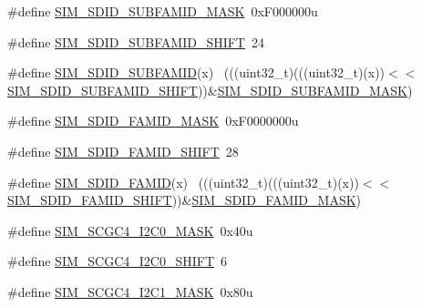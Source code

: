\begin{DoxyCompactItemize}
\item 
\#define \hyperlink{group___s_i_m___register___masks_ga530d8fe59d2589cf56c00456e89487aa}{S\+I\+M\+\_\+\+S\+D\+I\+D\+\_\+\+S\+U\+B\+F\+A\+M\+I\+D\+\_\+\+M\+A\+SK}~0x\+F000000u
\item 
\#define \hyperlink{group___s_i_m___register___masks_ga5e40d63bf136287a591bb4fa0b019aba}{S\+I\+M\+\_\+\+S\+D\+I\+D\+\_\+\+S\+U\+B\+F\+A\+M\+I\+D\+\_\+\+S\+H\+I\+FT}~24
\item 
\#define \hyperlink{group___s_i_m___register___masks_gaeb8cbd3ce47088f536b52d28b1f4a087}{S\+I\+M\+\_\+\+S\+D\+I\+D\+\_\+\+S\+U\+B\+F\+A\+M\+ID}(x)                                      ~(((uint32\+\_\+t)(((uint32\+\_\+t)(x))$<$$<$\hyperlink{group___s_i_m___register___masks_ga5e40d63bf136287a591bb4fa0b019aba}{S\+I\+M\+\_\+\+S\+D\+I\+D\+\_\+\+S\+U\+B\+F\+A\+M\+I\+D\+\_\+\+S\+H\+I\+FT}))\&\hyperlink{group___s_i_m___register___masks_ga530d8fe59d2589cf56c00456e89487aa}{S\+I\+M\+\_\+\+S\+D\+I\+D\+\_\+\+S\+U\+B\+F\+A\+M\+I\+D\+\_\+\+M\+A\+SK})
\item 
\#define \hyperlink{group___s_i_m___register___masks_ga5344e7283b2aead14d9d3bded0114f3b}{S\+I\+M\+\_\+\+S\+D\+I\+D\+\_\+\+F\+A\+M\+I\+D\+\_\+\+M\+A\+SK}~0x\+F0000000u
\item 
\#define \hyperlink{group___s_i_m___register___masks_ga377bc761e6ee1caab79baad3e2d0d331}{S\+I\+M\+\_\+\+S\+D\+I\+D\+\_\+\+F\+A\+M\+I\+D\+\_\+\+S\+H\+I\+FT}~28
\item 
\#define \hyperlink{group___s_i_m___register___masks_ga1c53c57d3312af915fc5419efec0b651}{S\+I\+M\+\_\+\+S\+D\+I\+D\+\_\+\+F\+A\+M\+ID}(x)                                            ~(((uint32\+\_\+t)(((uint32\+\_\+t)(x))$<$$<$\hyperlink{group___s_i_m___register___masks_ga377bc761e6ee1caab79baad3e2d0d331}{S\+I\+M\+\_\+\+S\+D\+I\+D\+\_\+\+F\+A\+M\+I\+D\+\_\+\+S\+H\+I\+FT}))\&\hyperlink{group___s_i_m___register___masks_ga5344e7283b2aead14d9d3bded0114f3b}{S\+I\+M\+\_\+\+S\+D\+I\+D\+\_\+\+F\+A\+M\+I\+D\+\_\+\+M\+A\+SK})
\item 
\#define \hyperlink{group___s_i_m___register___masks_ga55fc2bdfb36e61b4771015749307c480}{S\+I\+M\+\_\+\+S\+C\+G\+C4\+\_\+\+I2\+C0\+\_\+\+M\+A\+SK}~0x40u
\item 
\#define \hyperlink{group___s_i_m___register___masks_ga50185bca8ae97e6b0b0a70541757680b}{S\+I\+M\+\_\+\+S\+C\+G\+C4\+\_\+\+I2\+C0\+\_\+\+S\+H\+I\+FT}~6
\item 
\#define \hyperlink{group___s_i_m___register___masks_gad28d1d702a535531373c915824c34793}{S\+I\+M\+\_\+\+S\+C\+G\+C4\+\_\+\+I2\+C1\+\_\+\+M\+A\+SK}~0x80u

\end{DoxyCompactItemize}
